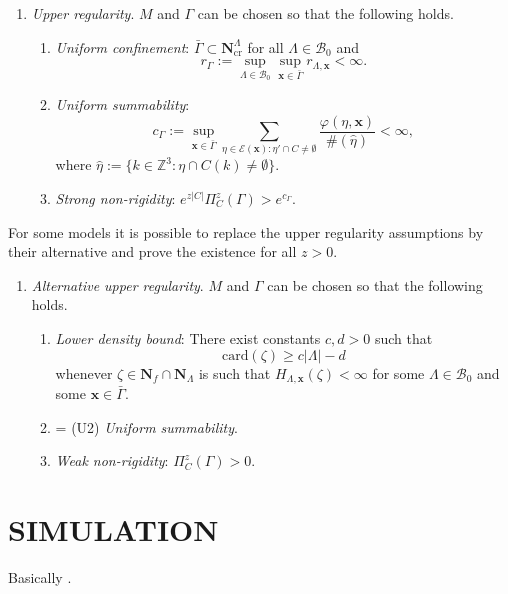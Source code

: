 \documentclass{kybernetika}
\newcommand{\x}{{\mathbf{x}}}
\begin{document}
\begin{enumerate}[\textbf{(U)}] 
	\item \textit{Upper regularity}. $M$ and $\Gamma$ can be chosen so that the following holds. 
		\begin{enumerate}[(U1)]
			\item \textit{Uniform confinement}: $\bar \Gamma \subset \mathbf N^\Lambda_\text{cr}$ for all $\Lambda \in \mathcal B_0$ and 
				\begin{equation}\label{eq:U1}r_\Gamma := \sup_{\Lambda\in\mathcal B_0}\sup_{\x \in \bar\Gamma} r_{\Lambda, \x} < \infty. \end{equation}
			\item \textit{Uniform summability}: 
			$$c_\Gamma := \sup_{\x \in \bar\Gamma}  \sum_{\eta \in \mathcal E(\x): \eta' \cap C \neq \emptyset} \frac{\varphi(\eta,\x)}{\#(\hat\eta)} < \infty,$$
where $\hat\eta := \{k \in \mathbb Z^3: \eta \cap C(k) \neq \emptyset\}$.
\item \textit{Strong non-rigidity}: $e^{z|C|} \Pi^z_C(\Gamma) > e^{c_\Gamma}$.
		\end{enumerate}
\end{enumerate}

For some models it is possible to replace the upper regularity assumptions by their alternative and prove the existence for all $z>0$.

\begin{enumerate}[(\textbf{\^{U}})]
	\item \textit{Alternative upper regularity}. $M$ and $\Gamma$ can be chosen so that the following holds.
	\begin{enumerate}[(\^U1)]
		\item \textit{Lower density bound}: There exist constants $c,d > 0$ such that 
			$$\mathrm{card}(\zeta) \geq c|\Lambda| - d$$
			whenever $\zeta \in \mathbf N_f\cap\mathbf  N_\Lambda$ is such that $H_{\Lambda,\x}(\zeta)<\infty$ for some $\Lambda \in \mathcal B_0$ and some $\x \in \bar\Gamma$.
		\item = (U2) \textit{Uniform summability}.
		\item \textit{Weak non-rigidity}: $\Pi^z_C(\Gamma) > 0$.
	\end{enumerate}
\end{enumerate}








\section{SIMULATION}
Basically \cite{DL11}.
\end{document}
